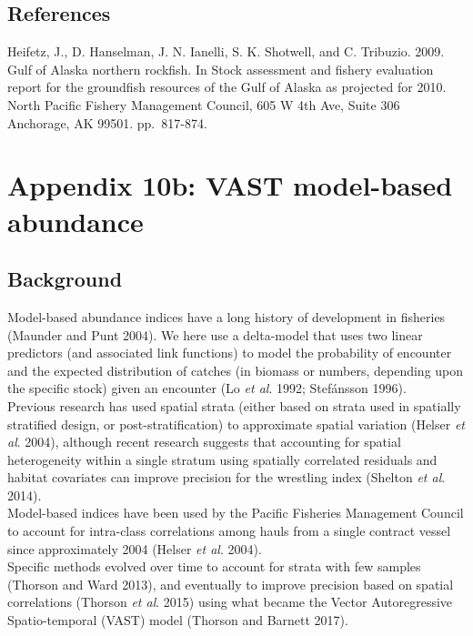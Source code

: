 \documentclass[
  11pt,
]{article}
\begin{document}
\hypertarget{references-1}{%
\subsection*{References}\label{references-1}}

Heifetz, J., D. Hanselman, J. N. Ianelli, S. K. Shotwell, and C. Tribuzio. 2009. Gulf of Alaska northern rockfish. In Stock assessment and fishery evaluation report for the groundfish resources of the Gulf of Alaska as projected for 2010. North Pacific Fishery Management Council, 605 W 4th Ave, Suite 306 Anchorage, AK 99501. pp.~817-874.

\hypertarget{appendix-10b-vast-model-based-abundance}{%
\section{Appendix 10b: VAST model-based abundance}\label{appendix-10b-vast-model-based-abundance}}

\hypertarget{background}{%
\subsection{Background}\label{background}}

Model-based abundance indices have a long history of development in fisheries (Maunder and Punt 2004).
We here use a delta-model that uses two linear predictors (and associated link functions) to model the probability of encounter and the expected distribution of catches (in biomass or numbers, depending upon the specific stock) given an encounter (Lo \emph{et al}. 1992; Stefánsson 1996).\\
Previous research has used spatial strata (either based on strata used in spatially stratified design, or post-stratification) to approximate spatial variation (Helser \emph{et al}. 2004), although recent research suggests that accounting for spatial heterogeneity within a single stratum using spatially correlated residuals and habitat covariates can improve precision for the wrestling index (Shelton \emph{et al}. 2014).\\
Model-based indices have been used by the Pacific Fisheries Management Council to account for intra-class correlations among hauls from a single contract vessel since approximately 2004 (Helser \emph{et al}. 2004).\\
Specific methods evolved over time to account for strata with few samples (Thorson and Ward 2013), and eventually to improve precision based on spatial correlations (Thorson \emph{et al}. 2015) using what became the Vector Autoregressive Spatio-temporal (VAST) model (Thorson and Barnett 2017).
\end{document}
